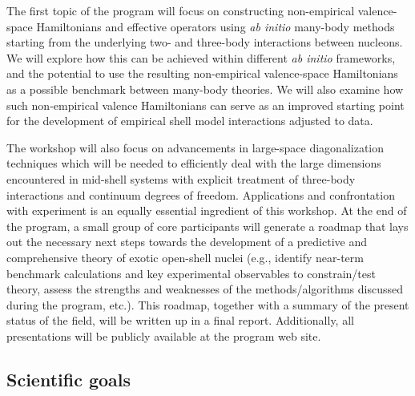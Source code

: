 \documentclass[%
twoside,                 %
final,                   %
10pt]{article}
\begin{document}
\noindent
The first topic of the program will focus on constructing non-empirical 
valence-space Hamiltonians and effective operators using \emph{ab initio} 
many-body methods starting from the underlying two- and three-body interactions 
between nucleons. We will explore how this can be achieved within different  \emph{ab initio} frameworks, and the potential to use the resulting non-empirical
valence-space Hamiltonians as a possible benchmark between many-body 
theories. We will also examine how such non-empirical valence Hamiltonians can 
serve as an improved starting point for the development of empirical shell model 
interactions adjusted to data. 

The workshop will also focus on advancements in large-space diagonalization techniques which will be needed to efficiently 
deal with the large dimensions encountered in mid-shell systems with explicit treatment of three-body interactions and continuum degrees of freedom. Applications and confrontation with experiment is an equally essential ingredient of this workshop.
At the end of the program, a small group of core participants will generate a roadmap that lays out the necessary next steps towards the development of a predictive and comprehensive theory of exotic open-shell nuclei (e.g., identify near-term benchmark calculations and key experimental observables to constrain/test theory, assess the strengths and weaknesses of the methods/algorithms discussed during the program, etc.). This roadmap, together with a summary of the present status of the field, will be written up in a final report. Additionally, all presentations will be publicly available at the program web site.





\subsection{Scientific goals}

\end{document}
